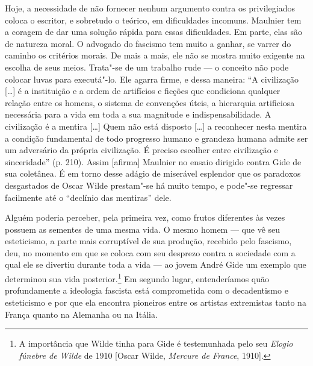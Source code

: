 Hoje, a necessidade de não fornecer nenhum argumento contra os
privilegiados coloca o escritor, e sobretudo o teórico, em dificuldades
incomuns. Maulnier tem a coragem de dar uma solução rápida para essas
dificuldades. Em parte, elas são de natureza moral. O advogado do
fascismo tem muito a ganhar, se varrer do caminho os critérios morais.
De mais a mais, ele não se mostra muito exigente na escolha de seus
meios. Trata"-se de um trabalho rude --- o conceito não pode colocar luvas
para executá"-lo. Ele agarra firme, e dessa maneira: ``A civilização
{[}\ldots{}{]} é a instituição e a ordem de artifícios e ficções que
condiciona qualquer relação entre os homens, o sistema de convenções
úteis, a hierarquia artificiosa necessária para a vida em toda a sua
magnitude e indispensabilidade. A civilização é a mentira {[}\ldots{}{]} Quem
não está disposto {[}\ldots{}{]} a reconhecer nesta mentira a condição
fundamental de todo progresso humano e grandeza humana admite ser um
adversário da própria civilização. É preciso escolher entre civilização
e sinceridade'' (p. 210). Assim {[}afirma{]} Maulnier no ensaio dirigido
contra Gide de sua coletânea. É em torno desse adágio de miserável
esplendor que os paradoxos desgastados de Oscar Wilde prestam"-se há
muito tempo, e pode"-se regressar facilmente até o ``declínio das
mentiras'' dele.

Alguém poderia perceber, pela primeira vez, como frutos diferentes às
vezes possuem as sementes de uma mesma vida. O mesmo homem --- que vê seu
esteticismo, a parte mais corruptível de sua produção, recebido pelo
fascismo, deu, no momento em que se coloca com seu desprezo contra a
sociedade com a qual ele se divertiu durante toda a vida --- ao jovem
André Gide um exemplo que determinou sua vida posterior.\footnote{A
  importância que Wilde tinha para Gide é testemunhada pelo seu
  \emph{Elogio fúnebre de Wilde} de 1910 {[}Oscar Wilde, \emph{Mercure
  de France}, 1910{]}. \versal{[N. A.]}} Em segundo lugar, entenderíamos quão
profundamente a ideologia fascista está comprometida com o decadentismo
e esteticismo e por que ela encontra pioneiros entre os artistas
extremistas tanto na França quanto na Alemanha ou na Itália.

